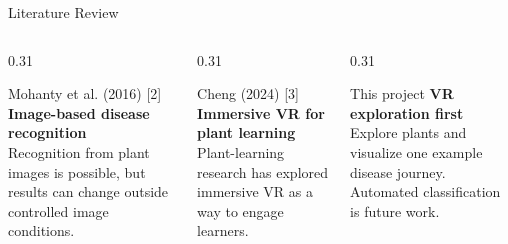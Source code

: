 \documentclass[aspectratio=169,11pt]{beamer}
\begin{document}
\begin{frame}{Literature Review}
  \begin{columns}[T]
    \begin{column}{0.31\textwidth}
      \begin{block}{Mohanty et al. (2016) [2]}
        \textbf{Image-based disease recognition}\\[3pt]
        Recognition from plant images is possible, but results can change outside controlled image conditions.
      \end{block}
    \end{column}
    \begin{column}{0.31\textwidth}
      \begin{block}{Cheng (2024) [3]}
        \textbf{Immersive VR for plant learning}\\[3pt]
        Plant-learning research has explored immersive VR as a way to engage learners.
      \end{block}
    \end{column}
    \begin{column}{0.31\textwidth}
      \begin{exampleblock}{This project}
        \textbf{VR exploration first}\\[3pt]
        Explore plants and visualize one example disease journey. Automated classification is future work.
      \end{exampleblock}
    \end{column}
  \end{columns}
\end{frame}
\end{document}
